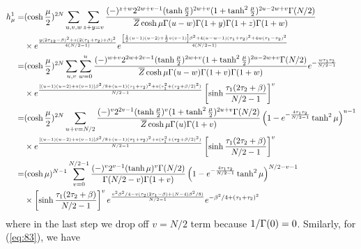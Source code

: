 \documentclass[11pt]{article}
\renewcommand{\>}{\rangle}
\newcommand{\<}{\langle}
\begin{document}
\begin{align}
h_{\mu}^{1}= & (\cosh\frac{\mu}{2})^{2N}\sum_{u,v,w}\sum_{z+y=v}\frac{(-)^{z+w}2^{2w+v-1}(\tanh\frac{\mu}{2})^{2w+v}(1+\tanh^{2}\frac{\mu}{2})^{2u-2w+v}\Gamma(N/2)}{\overline{Z}\cosh\mu\Gamma(u-w)\Gamma(1+y)\Gamma(1+z)\Gamma(1+w)}\nonumber \\
 & \times e^{\frac{y(2\tau_{12}-\beta)^{2}+z(2(\tau_{1}+\tau_{2})+\beta)^{2}}{4(N/2-1)}}e^{\frac{\left[\frac{1}{2}(u-1)(u-2)+\frac{1}{2}v(v-1)\right]\beta^{2}+4(u-w-1)(\tau_{1}+\tau_{2})^{2}+4w(\tau_{1}-\tau_{2})^{2}}{4(N/2-1)}}\nonumber \\
= & (\cosh\frac{\mu}{2})^{2N}\sum_{u,v}\sum_{w=0}^{u}\frac{(-)^{w+v}2^{2w+2v-1}(\tanh\frac{\mu}{2})^{2w+v}(1+\tanh^{2}\frac{\mu}{2})^{2u-2w+v}\Gamma(N/2)}{\overline{Z}\cosh\mu\Gamma(u-w)\Gamma(1+v)\Gamma(1+w)}e^{-\frac{w\tau_{1}\tau_{2}}{N/2-1}}\nonumber \\
 & \times e^{\frac{\left[(u-1)(u-2)+v(v-1)\right]\beta^{2}/8+(u-1)(\tau_{1}+\tau_{2})^{2}+v(\tau_{1}^{2}+(\tau_{2}+\beta/2)^{2})}{N/2-1}}\left[\sinh\frac{\tau_{1}(2\tau_{2}+\beta)}{N/2-1}\right]^{v}\nonumber \\
= & (\cosh\frac{\mu}{2})^{2N}\sum_{u+v=N/2}\frac{(-)^{v}2^{2v-1}(\tanh\frac{\mu}{2})^{v}(1+\tanh^{2}\frac{\mu}{2})^{2u+v}\Gamma(N/2)}{\overline{Z}\cosh\mu\Gamma(u)\Gamma(1+v)}\left(1-e^{-\frac{4\tau_{1}\tau_{2}}{N/2-1}}\tanh^{2}\mu\right)^{u-1}\nonumber \\
 & \times e^{\frac{\left[(u-1)(u-2)+v(v-1)\right]\beta^{2}/8+(u-1)(\tau_{1}+\tau_{2})^{2}+v(\tau_{1}^{2}+(\tau_{2}+\beta/2)^{2})}{N/2-1}}\left[\sinh\frac{\tau_{1}(2\tau_{2}+\beta)}{N/2-1}\right]^{v}\nonumber \\
= & (\cosh\mu)^{N-1}\sum_{v=0}^{N/2-1}\frac{(-)^{v}2^{v-1}(\tanh\mu)^{v}\Gamma(N/2)}{\Gamma(N/2-v)\Gamma(1+v)}\left(1-e^{-\frac{4\tau_{1}\tau_{2}}{N/2-1}}\tanh^{2}\mu\right)^{N/2-v-1}\nonumber \\
 & \times \left[\sinh\frac{\tau_{1}(2\tau_{2}+\beta)}{N/2-1}\right]^{v} e^{\frac{v^{2}\beta^{2}/4-v(\tau_{2}(2\tau_{1}-\beta)+(N-4)\beta^{2}/8)}{N/2-1}}e^{-\beta^{2}/4+(\tau_{1}+\tau_{2})^{2}}\label{eq:86}
\end{align}
where in the last step we drop off $v=N/2$ term because $1/\Gamma(0)=0$.
Smilarly, for (\ref{eq:83}), we have 
\end{document}
